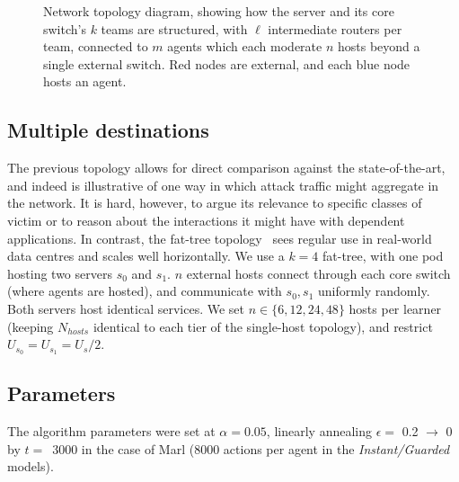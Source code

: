 \begin{figure}
	\centering
	\resizebox{0.9\linewidth}{!}{}
	\caption[Tree-structured network topology diagram for evaluating a single-destination network.]{
		Network topology diagram, showing how the server and its core switch's $k$ teams are structured, with $\ell$ intermediate routers per team, connected to $m$ agents which each moderate $n$ hosts beyond a single external switch.
		Red nodes are external, and each blue node hosts an agent.
		\label{fig:marl-topol}
	}
\end{figure}

\subsection{Multiple destinations}
The previous topology allows for direct comparison against the state-of-the-art, and indeed is illustrative of one way in which attack traffic might aggregate in the network.
It is hard, however, to argue its relevance to specific classes of victim or to reason about the interactions it might have with dependent applications.
In contrast, the fat-tree topology~\parencite{DBLP:conf/sigcomm/Al-FaresLV08} sees regular use in real-world data centres and scales well horizontally.
We use a $k=4$ fat-tree, with one pod hosting two servers $s_0$ and $s_1$.
$n$ external hosts connect through each core switch (where agents are hosted), and communicate with $s_0, s_1$ uniformly randomly.
Both servers host identical services.
We set $n \in \{6, 12, 24, 48\}$ hosts per learner (keeping $N_{\mathit{hosts}}$ identical to each tier of the single-host topology), and restrict $U_{s_0} = U_{s_1} = U_s / 2$.

\subsection{Parameters}
The algorithm parameters were set at $\alpha=0.05$, linearly annealing $\epsilon=$ \num{0.2} $\rightarrow$ 0 by $t=$~\num{3000} in the case of Marl (\num{8000} actions per agent in the \emph{Instant/Guarded} models).

